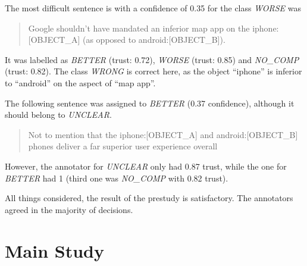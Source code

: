 The most difficult sentence is with a confidence of 0.35 for the class \emph{WORSE} was
\begin{quote}
Google shouldn't have mandated an inferior map app on the iphone:[OBJECT\_A] (as opposed to android:[OBJECT\_B]).
\end{quote}

It was labelled as \emph{BETTER} (trust: 0.72), \emph{WORSE} (trust: 0.85) and \emph{NO\_COMP} (trust: 0.82). The class \emph{WRONG} is correct here, as the object \enquote{iphone} is inferior to \enquote{android} on the aspect of \enquote{map app}.

The following sentence was assigned to \emph{BETTER} (0.37 confidence), although it should belong to \emph{UNCLEAR}.
\begin{quote}
Not to mention that the iphone:[OBJECT\_A] and android:[OBJECT\_B] phones deliver a far superior user experience overall
\end{quote}
However, the annotator for \emph{UNCLEAR} only had 0.87 trust, while the one for \emph{BETTER} had 1 (third one was \emph{NO\_COMP} with 0.82 trust).\newline

All things considered, the result of the prestudy is satisfactory. The annotators agreed in the majority of decisions. 



\section{Main Study}
